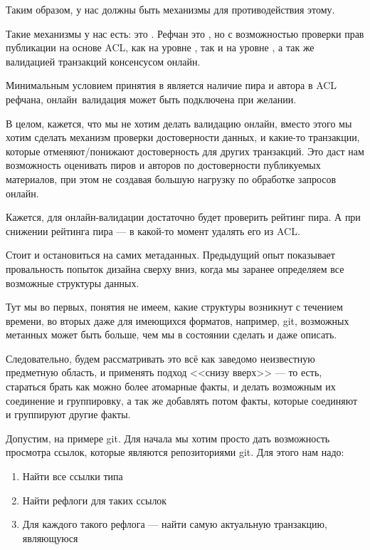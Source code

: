 Таким образом, у нас должны быть механизмы для противодействия этому.

Такие механизмы у нас есть: это . Рефчан это 
, но с возможностью проверки прав публикации на основе ACL, как на
уровне , так и на уровне , а так же валидацией транзакций
консенсусом онлайн.

Минимальным условием принятия  в  является
наличие пира и автора в ACL рефчана, онлайн~валидация может быть подключена при желании.

В целом, кажется, что мы не хотим делать валидацию онлайн, вместо этого мы хотим сделать механизм
проверки достоверности данных, и какие-то транзакции, которые отменяют/понижают достоверность для
других транзакций. Это даст нам возможность оценивать пиров и авторов по достоверности публикуемых
материалов, при этом не создавая большую нагрузку  по обработке запросов онлайн.

Кажется, для онлайн-валидации достаточно будет проверить рейтинг пира. А при снижении рейтинга пира
--- в какой-то момент удалять его из ACL.

Стоит и остановиться на самих метаданных. Предыдущий опыт показывает провальность попыток дизайна
сверху вниз, когда мы заранее  определяем все возможные структуры данных.

Тут мы во первых, понятия не имеем, какие структуры возникнут с течением времени, во вторых даже для
имеющихся форматов, например, git, возможных метанных может быть больше, чем мы в состоянии сделать
и даже описать.

Следовательно, будем рассматривать это всё как заведомо неизвестную предметную область, и применять
подход <<снизу вверх>> --- то есть, стараться брать как можно более атомарные факты, и делать
возможным их соединение и группировку, а так же добавлять потом факты, которые соединяют и
группируют другие факты.

Допустим, на примере git. Для начала мы хотим просто дать возможность просмотра ссылок, которые
являются репозиториями git. Для этого нам надо:

\begin{enumerate}
  \item Найти все ссылки типа 
  \item Найти рефлоги для таких ссылок
  \item Для каждого такого рефлога --- найти самую
        актуальную транзакцию, являющуюся 
\end{enumerate}

